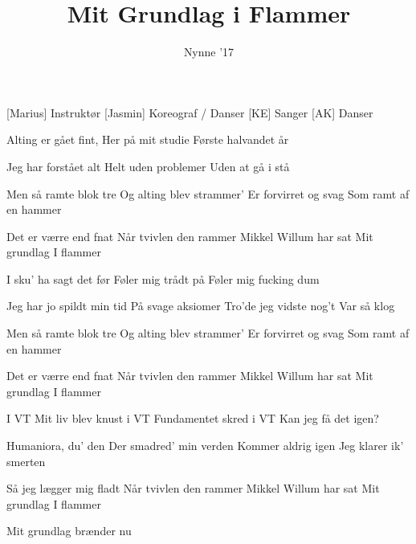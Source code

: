 \documentclass[a4paper,11pt]{article}
\title{Mit Grundlag i Flammer}
\author{Nynne '17}
\begin{document}
\maketitle

\begin{roles}
[Marius] Instruktør
[Jasmin] Koreograf / Danser
[KE] Sanger
[AK] Danser
\end{roles}

\begin{song}
 Alting er gået fint,
Her på mit studie
Første halvandet år

Jeg har forstået alt
Helt uden problemer
Uden at gå i stå

 Men så ramte blok tre
Og alting blev strammer'
Er forvirret og svag
Som ramt af en hammer

Det er værre end fnat
Når tvivlen den rammer
Mikkel Willum har sat
Mit grundlag I flammer

 I sku' ha sagt det før
Føler mig trådt på
Føler mig fucking dum

Jeg har jo spildt min tid
På svage aksiomer
Tro'de jeg vidste nog't
Var så klog

 Men så ramte blok tre
Og alting blev strammer'
Er forvirret og svag
Som ramt af en hammer

Det er værre end fnat
Når tvivlen den rammer
Mikkel Willum har sat
Mit grundlag I flammer

 I VT
Mit liv blev knust i VT
Fundamentet skred i VT
Kan jeg få det igen?

 Humaniora, du' den
Der smadred' min verden
Kommer aldrig igen
Jeg klarer ik' smerten

Så jeg lægger mig fladt
Når tvivlen den rammer
Mikkel Willum har sat
Mit grundlag I flammer

Mit grundlag brænder nu
\end{song}
\end{document}
